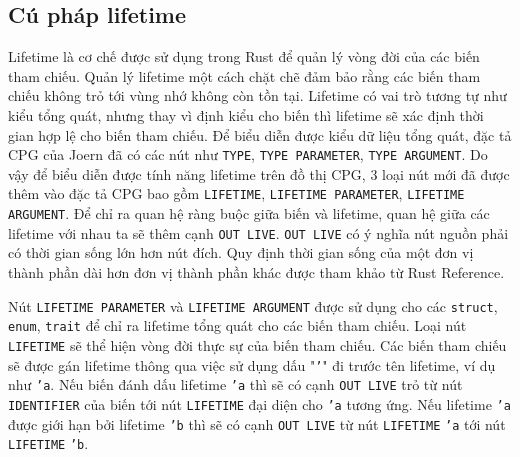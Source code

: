 \subsection{Cú pháp lifetime}

Lifetime là cơ chế được sử dụng trong Rust để quản lý vòng đời của các biến tham chiếu.
Quản lý lifetime một cách chặt chẽ đảm bảo rằng các biến tham chiếu không trỏ tới vùng nhớ không còn tồn tại.
Lifetime có vai trò tương tự như kiểu tổng quát, nhưng thay vì định kiểu cho biến thì lifetime sẽ xác định thời gian hợp lệ cho biến tham chiếu.
Để biểu diễn được kiểu dữ liệu tổng quát, đặc tả CPG của Joern đã có các nút như \texttt{TYPE}, \texttt{TYPE PARAMETER}, \texttt{TYPE ARGUMENT}.
Do vậy để biểu diễn được tính năng lifetime trên đồ thị CPG, 3 loại nút mới đã được thêm vào đặc tả CPG bao gồm \texttt{LIFETIME}, \texttt{LIFETIME PARAMETER}, \texttt{LIFETIME ARGUMENT}.
Để chỉ ra quan hệ ràng buộc giữa biến và lifetime, quan hệ giữa các lifetime với nhau ta sẽ thêm cạnh \texttt{OUT LIVE}. \texttt{OUT LIVE} có ý nghĩa nút nguồn phải có thời gian sống lớn hơn nút đích. Quy định thời gian sống của một đơn vị thành phần dài hơn đơn vị thành phần khác được tham khảo từ Rust Reference.

Nút \texttt{LIFETIME PARAMETER} và \texttt{LIFETIME ARGUMENT} được sử dụng cho các \texttt{struct}, \texttt{enum}, \texttt{trait} để chỉ ra lifetime tổng quát cho các biến tham chiếu.
Loại nút \texttt{LIFETIME} sẽ thể hiện vòng đời thực sự của biến tham chiếu.
Các biến tham chiếu sẽ được gán lifetime thông qua việc sử dụng dấu "\texttt{'}" đi trước tên lifetime, ví dụ như \texttt{'a}.
Nếu biến đánh dấu lifetime \texttt{'a} thì sẽ có cạnh \texttt{OUT LIVE} trỏ từ nút \texttt{IDENTIFIER} của biến tới nút \texttt{LIFETIME} đại diện cho \texttt{'a} tương ứng.
Nếu lifetime \texttt{'a} được giới hạn bởi lifetime \texttt{'b} thì sẽ có cạnh \texttt{OUT LIVE} từ nút \texttt{LIFETIME} \texttt{'a} tới nút \texttt{LIFETIME} \texttt{'b}.



